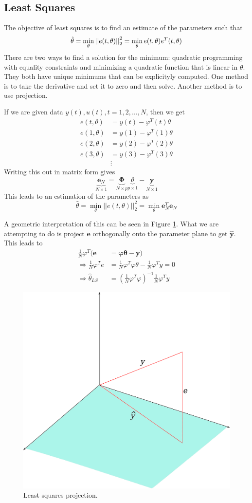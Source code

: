 \subsection{Least Squares}
The objective of least squares is to find an estimate of the parameters such that
$$\hat{\theta} = \min_\theta\left|\left|e(t,\theta)\right|\right|_2^2 = \min_\theta e(t,\theta)e^T(t,\theta)$$
There are two ways to find a solution for the minimum: quadratic programming with equality constraints and minimizing a quadratic function that is linear in $\theta$. They both have unique minimums that can be explicityly computed. One method is to take the derivative and set it to zero and then solve. Another method is to use projection.

If we are given data $y(t),u(t),t=1,2,\ldots,N$, then we get
\begin{align*}
e(t,\theta) &= y(t) - \varphi^T(t)\theta \\
e(1,\theta) &= y(1) - \varphi^T(1)\theta \\
e(2,\theta) &= y(2) - \varphi^T(2)\theta \\
e(3,\theta) &= y(3) - \varphi^T(3)\theta \\
&\vdots
\end{align*}
Writing this out in matrix form gives
$$\underbrace{\mathbf{e}_N}_{N\times 1} = \underbrace{\mathbf{\Phi}}_{N\times p}\underbrace{\theta}_{p\times 1} - \underbrace{\mathbf{y}}_{N\times 1}$$
This leads to an estimation of the parameters as
$$\hat{\theta} = \min_\theta ||e(t,\theta)||_2^2 = \min_\theta \mathbf{e}_N^T\mathbf{e}_N$$

A geometric interpretation of this can be seen in Figure \ref{fig:07ls}. What we are attempting to do is project $\mathbf{e}$ orthogonally onto the parameter plane to get $\hat{\mathbf{y}}$. This leads to
\begin{align*}
\frac{1}{N}\varphi^T(\mathbf{e} &= \mathbf{\varphi}\mathbf{\theta} - \mathbf{y}) \\
\Rightarrow \frac{1}{N}\varphi^Te &= \frac{1}{N}\varphi^T\varphi\theta - \frac{1}{N}\varphi^Ty = 0 \\
\Rightarrow \hat{\theta}_{LS} &= (\frac{1}{N}\varphi^T\varphi)^{-1}\frac{1}{N}\varphi^Ty
\end{align*}

\begin{figure}[ht!]
  \centering
  \includegraphics[width=.4\textwidth]{images/07ls}
  \caption{Least squares projection.}
  \label{fig:07ls}
\end{figure}

